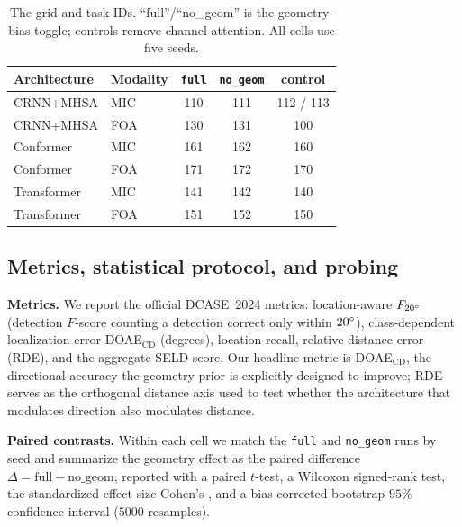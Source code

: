 \begin{table}[t]
\centering
\caption{The grid and task IDs. ``full''/``no\_geom'' is the geometry-bias
toggle; controls remove channel attention. All cells use five seeds.}
\label{tab:grid}
\begin{tabular}{llccc}
\toprule
Architecture & Modality & \texttt{full} & \texttt{no\_geom} & control \\
\midrule
CRNN+MHSA   & MIC & 110 & 111 & 112 / 113 \\
CRNN+MHSA   & FOA & 130 & 131 & 100 \\
Conformer   & MIC & 161 & 162 & 160 \\
Conformer   & FOA & 171 & 172 & 170 \\
Transformer & MIC & 141 & 142 & 140 \\
Transformer & FOA & 151 & 152 & 150 \\
\bottomrule
\end{tabular}
\end{table}

\subsection{Metrics, statistical protocol, and probing}
\label{sec:stats}
\textbf{Metrics.} We report the official DCASE~2024 metrics: location-aware
$F_{20^\circ}$ (detection $F$-score counting a detection correct only within
$20^\circ$), class-dependent localization error DOAE$_\mathrm{CD}$ (degrees),
location recall, relative distance error (RDE), and the aggregate SELD score. Our
headline metric is DOAE$_\mathrm{CD}$, the directional accuracy the geometry
prior is explicitly designed to improve; RDE serves as the orthogonal distance
axis used to test whether the architecture that modulates direction also
modulates distance.

\textbf{Paired contrasts.} Within each cell we match the \texttt{full} and
\texttt{no\_geom} runs by seed and summarize the geometry effect as the paired
difference $\Delta=\text{full}-\text{no\_geom}$, reported with a paired $t$-test,
a Wilcoxon signed-rank test, the standardized effect size Cohen's \dz, and a
bias-corrected bootstrap $95\%$ confidence interval ($5000$ resamples).

